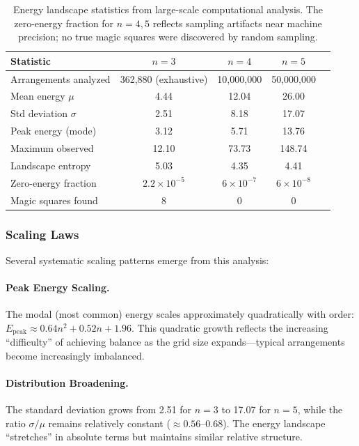 \begin{table}[H]
\centering
\begin{tabular}{lcccc}
\toprule
Statistic & $n = 3$ & $n = 4$ & $n = 5$ \\
\midrule
Arrangements analyzed & 362,880 (exhaustive) & 10,000,000 & 50,000,000 \\
Mean energy $\mu$ & 4.44 & 12.04 & 26.00 \\
Std deviation $\sigma$ & 2.51 & 8.18 & 17.07 \\
Peak energy (mode) & 3.12 & 5.71 & 13.76 \\
Maximum observed & 12.10 & 73.73 & 148.74 \\
Landscape entropy & 5.03 & 4.35 & 4.41 \\
Zero-energy fraction & $2.2 \times 10^{-5}$ & $6 \times 10^{-7}$ & $6 \times 10^{-8}$ \\
Magic squares found & 8 & 0 & 0 \\
\bottomrule
\end{tabular}
\caption{Energy landscape statistics from large-scale computational analysis.
The zero-energy fraction for $n=4,5$ reflects sampling artifacts near machine precision;
no true magic squares were discovered by random sampling.}
\label{tab:landscape_stats}
\end{table}

\subsubsection{Scaling Laws}

Several systematic scaling patterns emerge from this analysis:

\paragraph{Peak Energy Scaling.}
The modal (most common) energy scales approximately quadratically with order:
$E_{\text{peak}} \approx 0.64n^2 + 0.52n + 1.96$.
This quadratic growth reflects the increasing ``difficulty'' of achieving balance 
as the grid size expands---typical arrangements become increasingly imbalanced.

\paragraph{Distribution Broadening.}
The standard deviation grows from 2.51 for $n=3$ to 17.07 for $n=5$,
while the ratio $\sigma/\mu$ remains relatively constant ($\approx 0.56$--$0.68$).
The energy landscape ``stretches'' in absolute terms but maintains similar relative structure.

